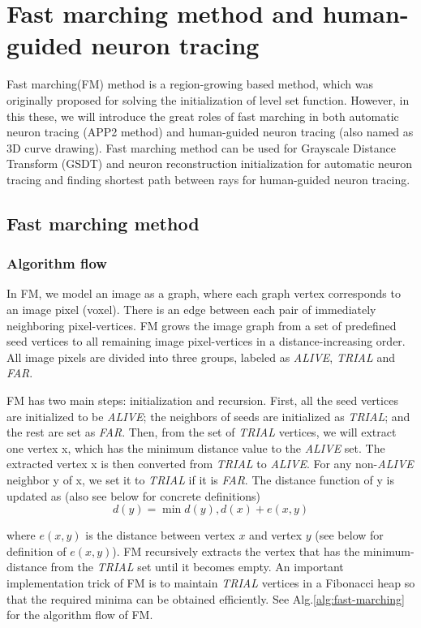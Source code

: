 \chapter{Fast marching method and human-guided neuron tracing} \label{chpt:fm}
Fast marching(FM) method \cite{sethian1999level} is a region-growing based method, which was originally proposed for solving the initialization of level set function. However, in this these, we will introduce the great roles of fast marching in both automatic neuron tracing (APP2 method) and human-guided neuron tracing (also named as 3D curve drawing). Fast marching method can be used for Grayscale Distance Transform (GSDT) and neuron reconstruction initialization for automatic neuron tracing and finding shortest path between rays for human-guided neuron tracing.
\section{Fast marching method}
\subsection{Algorithm flow}
In FM, we model an image as a graph, where each graph vertex corresponds to an image pixel (voxel). There is an edge between each pair of immediately neighboring pixel-vertices. FM grows the image graph from a set of predefined seed vertices to all remaining image pixel-vertices in a distance-increasing order.  All image pixels are divided into three groups, labeled as \emph{ALIVE}, \emph{TRIAL} and \emph{FAR}. 

FM has two main steps: initialization and recursion. First, all the seed vertices are initialized to be \emph{ALIVE}; the neighbors of seeds are initialized as \emph{TRIAL}; and the rest are set as \emph{FAR}. Then, from the set of \emph{TRIAL} vertices, we will extract one vertex x, which has the minimum distance value to the \emph{ALIVE} set. The extracted vertex x is then converted from \emph{TRIAL} to \emph{ALIVE}.  For any non-\emph{ALIVE} neighbor y of x, we set it to \emph{TRIAL} if it is \emph{FAR}. The distance function of y is updated as (also see below for concrete definitions)
\begin{equation}
d(y)=\min⁡{d(y),d(x)+e(x,y)}
\end{equation}

where $e(x,y)$ is the distance between vertex $x$ and vertex $y$ (see below for definition of $e(x,y)$). FM recursively extracts the vertex that has the minimum-distance from the \emph{TRIAL} set until it becomes empty.
An important implementation trick of FM is to maintain \emph{TRIAL} vertices in a Fibonacci heap so that the required minima can be obtained efficiently. See Alg.\ref{alg:fast-marching} for the algorithm flow of FM.

